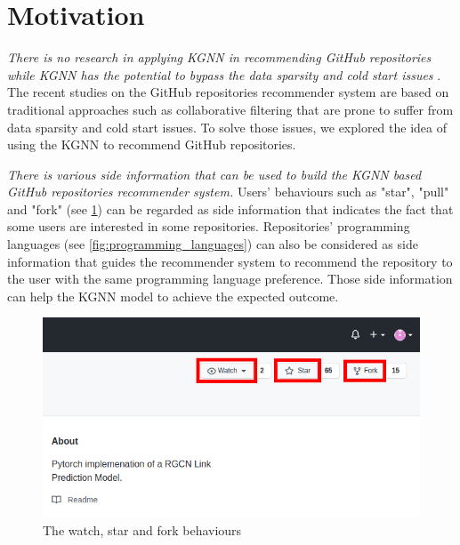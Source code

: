 \documentclass[11pt,twoside]{report}
\begin{document}
\section{Motivation}
\textit{There is no research in applying KGNN in recommending GitHub repositories while KGNN has the potential to bypass the data sparsity and cold start issues} \cite{mansur_review_nodate}. The recent studies on the GitHub repositories recommender system are based on traditional approaches such as collaborative filtering that are prone to suffer from data sparsity and cold start issues. To solve those issues, we explored the idea of using the KGNN to recommend GitHub repositories.

\textit{There is various side information that can be used to build the KGNN based GitHub repositories recommender system.} Users’ behaviours such as "star", "pull" and "fork" (see \ref{fig:watch_star_fork}) can be regarded as side information that indicates the fact that some users are interested in some repositories. Repositories' programming languages (see \ref{fig:programming_languages}) can also be considered as side information that guides the recommender system to recommend the repository to the user with the same programming language preference. Those side information can help the KGNN model to achieve the expected outcome.

\begin{figure}[H]
    \centering
    \includegraphics[scale=0.4]{watch_star_fork.png}
    \caption{The watch, star and fork behaviours}
    \label{fig:watch_star_fork}
\end{figure}
\end{document}
